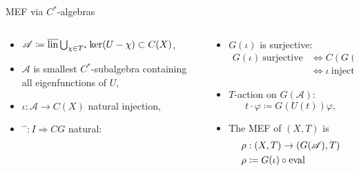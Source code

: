 \begin{frame}[fragile]{MEF via $C^*$-algebras}
  \begin{columns}[t]
    \begin{column}{0.5\textwidth}
     \begin{itemize}
       \item $\mathscr{A}\coloneq \overline{\operatorname{lin}} \bigcup_{\chi \in T^*} \ker (U- \chi) \subset C(X)$,
    \item  $\mathscr{A}$ is smallest $C^*$-subalgebra containing all eigenfunctions of $U$,
    \item $\iota : \mathscr{A} \to C(X)$ natural injection,
    \item \pause
$\widehat{\phantom{a}}: I \Rightarrow CG$ natural:
     \end{itemize}
    \end{column}
    \begin{column}{0.5 \textwidth}
 \begin{itemize}
   \item \pause $G(\iota)$ is surjective:
       \begin{equation*}
        \begin{split}
          G(\iota) \ \text{surjective} &\Leftrightarrow C (G( \iota )) \ \text{injective} \\
          &\Leftrightarrow \iota \ \text{injective}
        \end{split}
              \end{equation*}
    \item \pause
$T$-action on $G(\mathscr{A})$:
      \begin{equation*}
      t\cdot \varphi \coloneq G(U(t))\varphi,
      \end{equation*}
    \item The MEF of $(X,T)$ is
      \begin{equation*}
        \begin{split}
          &\rho : (X,T) \to (G(\mathscr{A}),T)\\ 
          &\rho\coloneq G(\iota) \circ \operatorname{eval}
        \end{split}
      \end{equation*}
   \end{itemize}
    \end{column}
  \end{columns}
  \end{frame}
